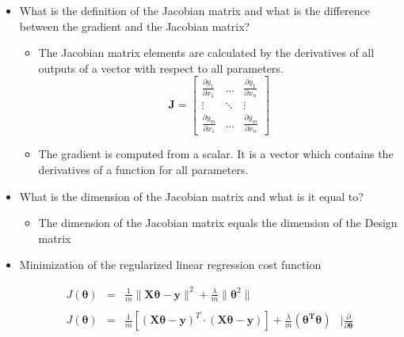 \documentclass{article}
\begin{document}
\begin{itemize}
    \item What is the definition of the Jacobian matrix and what is the difference between the gradient and the Jacobian matrix?
    
    \begin{itemize}
        \item The Jacobian matrix elements are calculated by the derivatives of all outputs of a vector with respect to all parameters.  \\
            $$ \boldsymbol{J} = 
            \begin{bmatrix}
            	\frac{\partial y_1}{\partial x_1}	&	\dots	&	\frac{\partial y_1}{\partial x_n} 	\\
            	\vdots								&	\ddots	&	\vdots								\\
            	\frac{\partial y_m}{\partial x_1	}	&	\dots	&	\frac{\partial y_m}{\partial x_n}
            \end{bmatrix} $$
            
        \item The gradient is computed from a scalar. It is a vector which contains the derivatives of a function for all parameters.              
    \end{itemize}
    
    \item What is the dimension of the Jacobian matrix and what is it equal to?
    
    \begin{itemize}
    
        \item The dimension of the Jacobian matrix equals the dimension of the Design matrix
    
    \end{itemize}
    
    \item Minimization of the regularized linear regression cost function
    
    $$\begin{array}{rclr}
        J(\boldsymbol{\theta}) & = & \frac{1}{m} \| \boldsymbol{X\theta - y} \|^2 + \frac{\lambda}{m} \| \boldsymbol{\theta}^2 \| & \\\\
        J(\boldsymbol{\theta}) & = & \frac{1}{m} \left[(\boldsymbol{X\theta - y})^T \cdot (\boldsymbol{X\theta - y}) \right] + \frac{\lambda}{m} (\boldsymbol{\theta^T \theta}) & \mid \frac{\partial}{\partial\boldsymbol{\theta}} \\
      \end{array}$$
    

\end{itemize}
\end{document}
